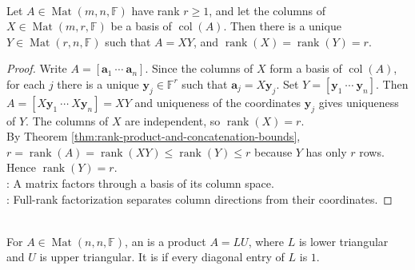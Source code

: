 \begin{theorem} \label{thm:full-rank-factorization} \\
Let $A\in\operatorname{Mat}(m,n,\mathbb{F})$ have rank $r\geq 1$, and let the columns of $X\in\operatorname{Mat}(m,r,\mathbb{F})$ be a basis of $\operatorname{col}(A)$. Then there is a unique $Y\in\operatorname{Mat}(r,n,\mathbb{F})$ such that $A=XY$, and $\operatorname{rank}(X)=\operatorname{rank}(Y)=r$.
\begin{proof}
Write $A=[\mathbf{a}_1\ \cdots\ \mathbf{a}_n]$. Since the columns of $X$ form a basis of $\operatorname{col}(A)$, for each $j$ there is a unique $\mathbf{y}_j\in\mathbb{F}^r$ such that $\mathbf{a}_j=X\mathbf{y}_j$. Set $Y=[\mathbf{y}_1\ \cdots\ \mathbf{y}_n]$. Then $A=[X\mathbf{y}_1\ \cdots\ X\mathbf{y}_n]=XY$ and uniqueness of the coordinates $\mathbf{y}_j$ gives uniqueness of $Y$. The columns of $X$ are independent, so $\operatorname{rank}(X)=r$.\\
By Theorem \ref{thm:rank-product-and-concatenation-bounds}, $r=\operatorname{rank}(A)=\operatorname{rank}(XY)\leq \operatorname{rank}(Y)\leq r$ because $Y$ has only $r$ rows. Hence $\operatorname{rank}(Y)=r$.\\
: A matrix factors through a basis of its column space.\\
: Full-rank factorization separates column directions from their coordinates.
\end{proof}
\end{theorem}

\begin{definition} \label{def:lu-factorization} \\
For $A\in\operatorname{Mat}(n,n,\mathbb{F})$, an  is a product $A=LU$, where $L$ is lower triangular and $U$ is upper triangular. It is  if every diagonal entry of $L$ is $1$.
\end{definition}

